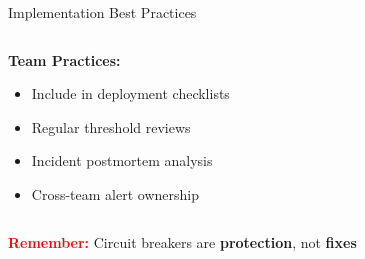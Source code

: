 \documentclass[aspectratio=169]{beamer}
\begin{document}
\begin{frame}{Implementation Best Practices}
\begin{columns}
\begin{column}{0.5\textwidth}
            \vspace{0.3cm}
            \textbf{Team Practices:}
            \begin{itemize}
                \item Include in deployment checklists
                \item Regular threshold reviews
                \item Incident postmortem analysis
                \item Cross-team alert ownership
            \end{itemize}
        \end{column}
    \end{columns}
    
    \vspace{0.5cm}
    \begin{center}
        \textcolor{red}{\textbf{Remember:}} Circuit breakers are \textbf{protection}, not \textbf{fixes}
    \end{center}
\end{frame}
\end{document}
